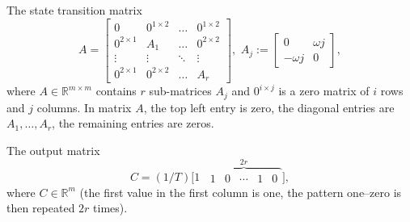 \documentclass[letterpaper,10pt,journal,twoside]{IEEEtran}
\theoremstyle{definition}
\begin{document}
The state transition matrix
\begin{equation}\label{eq:mat_A}
  A=\begin{bmatrix}
    0            & 0^{1\times 2}& \dots & 0^{1\times 2} \\
    0^{2\times 1}& A_1          & \dots & 0^{2\times 2} \\
    \vdots       & \vdots       & \ddots& \vdots        \\
    0^{2\times 1}& 0^{2\times 2}& \dots & A_r 
  \end{bmatrix},\,\,A_j:=\begin{bmatrix}0 & \omega j \\ -\omega j & 0\end{bmatrix},
\end{equation}
where $A\in\mathbb{R}^{m\times m}$ contains $r$ sub-matrices $A_j$ and $0^{i\times j}$ is a zero matrix of $i$ rows and $j$ columns. In matrix $A$, the top left entry is zero, the diagonal entries are $A_1,\dots,A_r$, the remaining entries are zeros.

The output matrix\vspace*{-2ex}
\begin{equation}\label{eq:mat_C}
  C=(1/T)\Big[1 \,\,\, \overbrace{\begin{matrix}1 & 0 &\cdots & 1 & 0\end{matrix}}^{2r}\Big],
\end{equation}
where $C\in\mathbb{R}^m$ (the first value in the first column is one, the pattern one--zero is then repeated $2r$ times).


\end{document}
